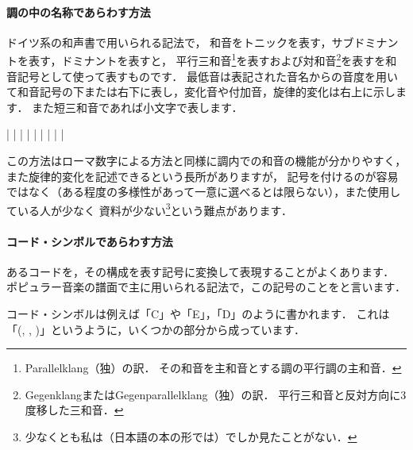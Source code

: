 \documentclass[dvipdfmx,uplatex,b5paper,openany,jbase=12Q,nomag*,textwidth-limit=44%
               ]{gachimuchi}[2020/05/05]
\begin{document}
\paragraph{調の中の名称であらわす方法}
ドイツ系の和声書で用いられる記法で，
和音をトニックを表す，サブドミナントを表す，ドミナントを表すと，
平行三和音\footnote{%
  Parallelklang（独）の訳．
  その和音を主和音とする調の平行調の主和音．
}を表すおよび対和音\footnote{%
  GegenklangまたはGegenparallelklang（独）の訳．
  平行三和音と反対方向に3度移した三和音．
}を表すを和音記号として使って表すものです．
最低音は表記された音名からの音度を用いて和音記号の下または右下に表し，変化音や付加音，旋律的変化は右上に示します．
また短三和音であれば小文字で表します．
\begin{Music}[0.8\linewidth]
  \Startpiece%
  \Notes%
  \zchordsu{}|%
  \en\Notes%
  |%
  \en\Notes%
  |%
  \en\bar
  \Notes%
  \zchordsu{}|%
  \en\Notes%
  \zchordsu{}|%
  \en\Notes%
  \zchordsu{}|%
  \en\Notes%
  \zchordsu{}|%
  \en\Notes%
  \zchordsu{}|%
  \en\setdoublebar%
  \endpiece%
\end{Music}

この方法はローマ数字による方法と同様に調内での和音の機能が分かりやすく，
また旋律的変化を記述できるという長所がありますが，
記号を付けるのが容易ではなく（ある程度の多様性があって一意に選べるとは限らない），また使用している人が少なく
資料が少ない\footnote{
  少なくとも私は（日本語の本の形では）でしか見たことがない．
}という難点があります．

\paragraph{コード・シンボルであらわす方法}
あるコードを，その構成を表す記号に変換して表現することがよくあります．
ポピュラー音楽の譜面で主に用いられる記法で，この記号のことをと言います．

コード・シンボルは例えば「C」や「E\aFlat{}」，「D\Min{}」のように書かれます．
これは「\txCirc(\Min , \Dimt , \Aug)\lhsc\txSqr\txTri」というように，いくつかの部分から成っています．
\end{document}
